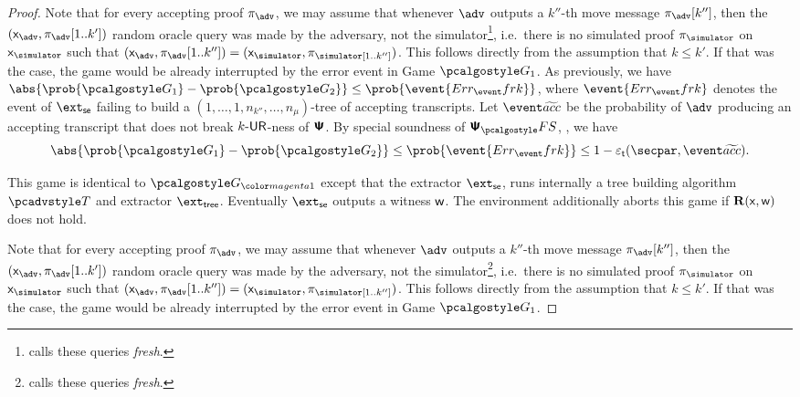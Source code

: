 \begin{proof}
	 Note that for every accepting proof $\zkproof_{\advse}$, we 	may assume that whenever $\advse$ outputs a $k''$-th move message $\zkproof_{\advse}[k'']$, then the $(\inp_{\advse}, \zkproof_{\advse}[1..k'])$ 	random oracle query was made by the adversary, not the simulator\footnote{\cite{INDOCRYPT:FKMV12} calls these queries \emph{fresh}.}, i.e.~there is no simulated proof $\zkproof_\simulator$ on $\inp_\simulator$ such that $(\inp_{\advse}, \zkproof_{\advse} [1..k'']) = (\inp_\simulator, \zkproof_\simulator[1..k''])$. This follows directly from the assumption that $k \leq k'$. If that was the case, the game would be already interrupted by the error event in Game $\game{1}$. As previously, we have $\abs{\prob{\game{1}} - \prob{\game{2}}} \leq \prob{\event{\errfrk}}$, where $\event{\errfrk}$ denotes the event of $\extse$ failing to build a $(1, \ldots, 1, n_{k''}, \ldots, n_\mu)$-tree of accepting transcripts. Let $\waccProb$ be the probability of $\advse$ producing an accepting transcript that does not break ${k\text{-}\mathsf{UR}}$-ness of $\bm{\mathsf{\Psi}}$. By special soundness of $\proofsystem_\fs$, , we have 
		\begin{equation}
		\abs{\prob{\game{1}} - \prob{\game{2}}} \leq \prob{\event{\errfrk}} \leq 1 - 
		\epst(\secpar, \waccProb).
		\end{equation}		
	\fi
	
	 This game is identical to $\game{\changedm{1}}$ except that the extractor $\extse$, runs internally a tree building algorithm $\tdv$ and extractor $\extt$. Eventually $\extse$ outputs a witness $\mathsf{w}$. The environment additionally aborts this game if $\mathbf{R}(\mathsf{x}, \mathsf{w})$ does not hold.
	
	Note that for every accepting proof $\zkproof_{\advse}$, we 	may assume that whenever $\advse$ outputs a $k''$-th move message $\zkproof_{\advse}[k'']$, then the $(\inp_{\advse}, \zkproof_{\advse}[1..k'])$ 	random oracle query was made by the adversary, not the simulator\footnote{\cite{INDOCRYPT:FKMV12} calls these queries \emph{fresh}.}, i.e.~there is no simulated proof $\zkproof_\simulator$ on $\inp_\simulator$ such that $(\inp_{\advse}, \zkproof_{\advse} [1..k'']) = (\inp_\simulator, \zkproof_\simulator[1..k''])$. This follows directly from the assumption that $k \leq k'$. If that was the case, the game would be already interrupted by the error event in Game $\game{1}$.


\end{proof}
